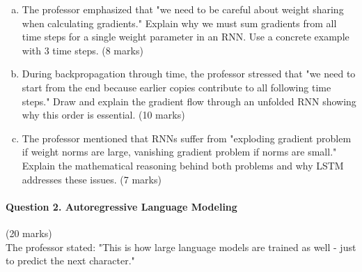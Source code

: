 \documentclass[12pt]{article}
\newcommand{\shortanswer}{\vspace{2cm}}
\newcommand{\mediumanswer}{\vspace{3cm}}
\begin{document}
\begin{enumerate}[(a)]
    \item The professor emphasized that "we need to be careful about weight sharing when calculating gradients." Explain why we must sum gradients from all time steps for a single weight parameter in an RNN. Use a concrete example with 3 time steps. \hfill (8 marks)
    
    \mediumanswer
    
    \item During backpropagation through time, the professor stressed that "we need to start from the end because earlier copies contribute to all following time steps." Draw and explain the gradient flow through an unfolded RNN showing why this order is essential. \hfill (10 marks)
    
    \begin{center}
    \end{center}
    
    \shortanswer
    
    \item The professor mentioned that RNNs suffer from "exploding gradient problem if weight norms are large, vanishing gradient problem if norms are small." Explain the mathematical reasoning behind both problems and why LSTM addresses these issues. \hfill (7 marks)
    
    \mediumanswer
\end{enumerate}

\newpage
\paragraph{Question 2. Autoregressive Language Modeling}\hfill (20 marks)\\
The professor stated: "This is how large language models are trained as well - just to predict the next character."
\end{document}
